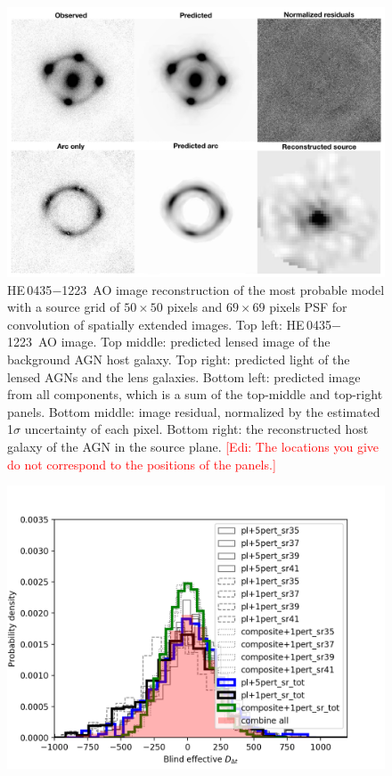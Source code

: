 \documentclass[useAMS,usenatbib]{mnras}
\newcommand\todo[1]{\textcolor{red}{#1}}
\newcommand\he{HE\,0435$-$1223}
\begin{document}
\begin{figure}
\centering
\includegraphics[scale=0.6]{HE0435_AO_image.png}
\caption{\he~AO image reconstruction of the most probable model with a source grid of $50 \times 50$ pixels and $69 \times 69$ pixels PSF for convolution of spatially extended images. Top left: \he~AO image. Top middle: predicted lensed image of the background AGN host galaxy. Top right: predicted light of the lensed AGNs and the lens galaxies. Bottom left: predicted image from all components, which is a sum of the top-middle and top-right panels. Bottom middle: image residual, normalized by the estimated 1$\sigma$ uncertainty of each pixel. Bottom right: the reconstructed host galaxy of the AGN in the source plane. \todo{[Edi: The locations you give do not correspond to the positions of the panels.]}}
\label{fig:HE0435_figure}
\end{figure}

\begin{figure}
\centering
\includegraphics[scale=1.0]{HE0435_systematics_tests4.png}
\caption{}
\label{fig:HE0435_Ddt}
\end{figure}
\end{document}
